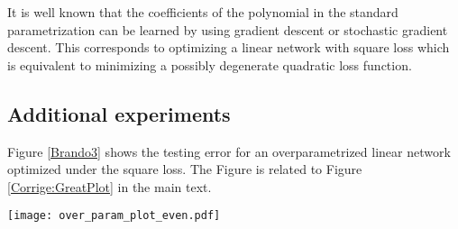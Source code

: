 \documentclass[10pt]{article}
\begin{document}
It is well known that the coefficients of the polynomial in the standard
parametrization can be learned by using gradient descent or stochastic
gradient descent. This corresponds to optimizing  a linear network with square
loss which is equivalent to minimizing  a possibly degenerate
quadratic loss function. 


\subsection{Additional experiments}


Figure \ref{Brando3} shows the testing error for an overparametrized
linear network optimized under the square loss. The Figure is related
to Figure \ref{Corrige:GreatPlot} in the main text.

\begin{figure*}[h!]\centering
\texttt{[image: over\_param\_plot\_even.pdf]}
\caption{\it Training and testing with the square loss for a linear
  network in the feature space (i.e. $y = W\phi(X)$) with a degenerate
  Hessian of the type of Figure \ref{degeneratesquareloss}. The
  feature matrix is a polynomial with increasing degree, from 1 to
  300.  The square loss is plotted vs the number of monomials, that is
  the number of parameters.  The target function is a sine function
  $f(x) = sin(2 \pi f x ) $ with frequency $f=4$ on the interval
  $[-1,1]$.  The number of training points where $76$ and the number
  of test points were $600$.  The solution to the over-parametrized
  system was the minimum norm solution.  More points where sampled at
  the edges of the interval $[-1,1]$ (i.e. using Chebyshev nodes) to
  avoid exaggerated numerical errors.  The figure shows how eventually
  the minimum norm solution overfits.}
\label{Brando3}
\end{figure*}

\end{document}
